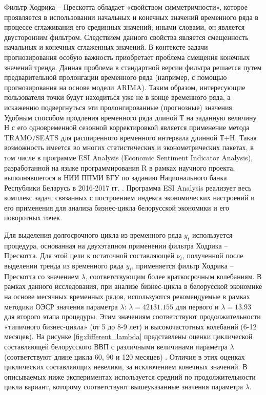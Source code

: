 \documentclass[a4paper,14pt]{extreport}
\begin{document}
	Фильтр Ходрика -- Прескотта обладает «свойством симметричности», которое проявляется в использовании начальных и конечных значений временного ряда в процессе сглаживания его срединных значений; иными словами, он является двусторонним фильтром. Следствием данного свойства является смещенность начальных и конечных сглаженных значений. В контексте задачи прогнозирования особую важность приобретает проблема смещения конечных значений тренда. Данная проблема в стандартной версии фильтра решается путем предварительной пролонгации временного ряда (например, с помощью прогнозирования на основе модели ARIMA). Таким образом, интересующие пользователя точки будут находиться уже не в конце временного ряда, а искажению подвергнуться эти пролонгированные (прогнозные) значения. Удобным способом продления временного ряда длиной Т на заданную величину Н с его одновременной сезонной корректировкой является применение метода TRAMO/SEATS для расширенного временного интервала длинной Т+H. Такая возможность имеется во многих статистических и эконометрических пакетах, в том числе в программе ESI Analysis (Economic Sentiment Indicator Analysis), разработанной на языке программирования R в рамках научного проекта, выполнявшегося в НИИ ППМИ БГУ по заданию Национального банка Республики Беларусь в 2016-2017 гг. \cite{esiMaking}. Программа ESI Analysis реализует весь комплекс задач, связанных с построением индекса экономических настроений и его применения для анализа бизнес-цикла белорусской экономики и его поворотных точек.  
	
	Для выделения долгосрочного цикла из временного ряда $y_t$ используется процедура, основанная на двухэтапном применении фильтра Ходрика -- Прескотта. Для этой цели к остаточной составляющей $\nu_t$, полученной после выделении тренда из временного ряда $y_t$, применяется фильтр Ходрика -- Прескотта со значением $\lambda$, соответствующим более краткосрочным колебаниям. В рамках данного исследования, при анализе бизнес-цикла в белорусской экономике на основе месячных временных рядов,  используются рекомендуемые в рамках методики ОЭСР значения параметра $\lambda$:  $\lambda = 42131.155$ для первого и $\lambda = 13.93$ для второго этапа процедуры. Этим значениям соответствуют продолжительности «типичного бизнес-цикла» (от 5 до 8-9 лет) и высокочастотных колебаний (6-12 месяцев). На рисунке \ref{fig:different_lambda} представлены оценки циклической составляющей белорусского ВВП с различными величинами параметра $\lambda$ (соответствуют длине цикла 60, 90 и 120 месяцев) \cite{esiMakingAlt}. Отличия в этих оценках циклических составляющих невелики, за исключением конечных значений.  В описываемых ниже экспериментах используется средний по продолжительности цикла вариант, которому соответствуют вышеуказанные значения параметра $\lambda$.
	
\end{document}
